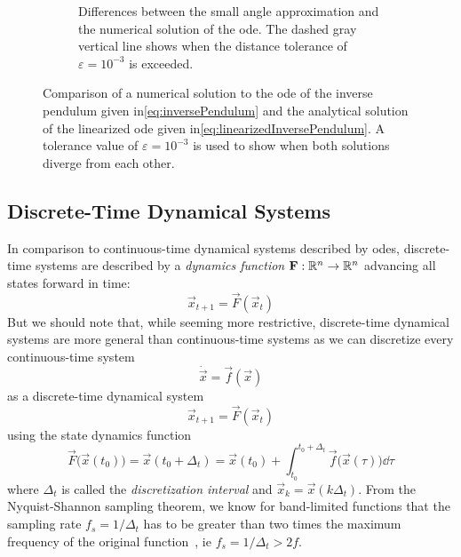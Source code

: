 \begin{figure}
\begin{subfigure}[t]{0.5\linewidth}
				\caption{Differences between the small angle approximation and the numerical solution of the \ac{ode}. The dashed gray vertical line shows when the distance tolerance of \( \varepsilon = 10^{-3} \) is exceeded.}
			\end{subfigure}
			\caption{Comparison of a numerical solution to the \ac{ode} of the inverse pendulum given in\eqref{eq:inversePendulum} and the analytical solution of the linearized \ac{ode} given in\eqref{eq:linearizedInversePendulum}. A tolerance value of \( \varepsilon = 10^{-3} \) is used to show when both solutions diverge from each other.}
			\label{fig:inversePendulumApprox}
		\end{figure}

	\subsection{Discrete-Time Dynamical Systems}
		In comparison to continuous-time dynamical systems described by \acp{ode}, discrete-time systems are described by a \emph{dynamics function} \( \boldsymbol{\mathrm{F}} : \mathbb{R}^n \to \mathbb{R}^n \) advancing all states forward in time:
		\begin{equation*}
			\vec{x}_{t + 1} = \vec{F}(\vec{x}_t)
		\end{equation*}
		But we should note that, while seeming more restrictive, discrete-time dynamical systems are more general than continuous-time systems as we can discretize every continuous-time system
		\begin{equation*}
			\dot{\vec{x}} = \vec{f}(\vec{x})
		\end{equation*}
		as a discrete-time dynamical system
		\begin{equation*}
			\vec{x}_{t + 1} = \vec{F}(\vec{x}_t)
		\end{equation*}
		using the state dynamics function
		\begin{equation*}
			\vec{F}\big(\vec{x}(t_0)\big) = \vec{x}(t_0 + \Delta_t) = \vec{x}(t_0) + \int_{t_0}^{t_0 + \Delta_t} \! \vec{f}\big(\vec{x}(\tau)\big) \dd{\tau}
		\end{equation*}
		where \( \Delta_t \) is called the \emph{discretization interval} and \( \vec{x}_k = \vec{x}(k \Delta_t) \). From the Nyquist-Shannon sampling theorem, we know for band-limited functions that the sampling rate \( f_s = 1/\Delta_t \) has to be greater than two times the maximum frequency of the original function~\cite{shannonCommunicationPresenceNoise1949}, \ac{ie} \( f_s = 1/\Delta_t > 2 f \).
